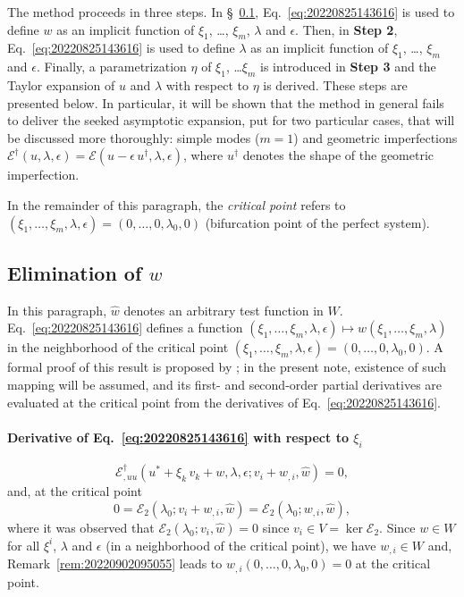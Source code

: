 \documentclass[12pt, final]{scrartcl}
\theoremstyle{definition}
\newcommand{\E}{\mathcal E}
\newcommand{\EE}{\mathcal E ^ \dagger}
\newcommand{\uu}{u^\dagger}
\begin{document}
The method proceeds in three steps. In \S~\ref{sec:20221020140204}, Eq.~\eqref{eq:20220825143616} is used to define $w$
as an implicit function of $\xi_1$, \dots, $\xi_m$, $\lambda$ and \(\epsilon\). Then, in \textbf{Step 2},
Eq.~\eqref{eq:20220825143616} is used to define $\lambda$ as an implicit function of $\xi_1$, \dots, $\xi_m$ and
\(\epsilon\). Finally, a parametrization $\eta$ of $\xi_1$, \dots $\xi_m$ is introduced in \textbf{Step 3} and the
Taylor expansion of $u$ and $\lambda$ with respect to $\eta$ is derived. These steps are presented below. In particular,
it will be shown that the method in general fails to deliver the seeked asymptotic expansion, put for two particular
cases, that will be discussed more thoroughly: simple modes (\(m = 1\)) and geometric imperfections
\(\EE(u, \lambda, \epsilon) = \E(u - \epsilon \, \uu, \lambda, \epsilon)\), where \(\uu\) denotes the shape of the
geometric imperfection.

In the remainder of this paragraph, the \emph{critical point} refers to
\((\xi_1, \ldots, \xi_m, \lambda, \epsilon) = (0, \ldots, 0, \lambda_0, 0)\) (bifurcation point of the perfect system).

\subsection{Elimination of \(w\)}
\label{sec:20221020140204}

In this paragraph, $\hat{w}$ denotes an arbitrary test function in $W$. Eq.~\eqref{eq:20220825143616} defines a function
$(\xi_1, \ldots, \xi_m, \lambda, \epsilon) \mapsto w(\xi_1, \ldots, \xi_m, \lambda)$ in the neighborhood of the critical point
$(\xi_1, \ldots, \xi_m, \lambda, \epsilon) = (0, \ldots, 0, \lambda_0, 0)$. A formal proof of this result is proposed by \textcite{poti1987}; in the
present note, existence of such mapping will be assumed, and its first- and second-order partial derivatives are
evaluated at the critical point from the derivatives of Eq.~\eqref{eq:20220825143616}.

\paragraph{Derivative of Eq.~\eqref{eq:20220825143616} with respect to \(\xi_i\)}
\begin{equation}
  \label{eq:20220826140926}
  \EE_{,uu}(u^\ast + \xi_k \, v_k + w, \lambda, \epsilon; v_i + w_{,i}, \hat{w}) = 0,
\end{equation}
and, at the critical point
\begin{equation}
  \label{eq:20220825150219}
  0 = \E_2(\lambda_0; v_i + w_{,i}, \hat{w}) = \E_2(\lambda_0; w_{,i}, \hat{w}),
\end{equation}
where it was observed that \(\E_2(\lambda_0; v_i, \hat{w}) = 0\) since \(v_i \in V = \ker \E_2\). Since $w \in W$ for all
$\xi^i$, $\lambda$ and \(\epsilon\) (in a neighborhood of the critical point), we have $w_{,i} \in W$ and,
Remark~\ref{rem:20220902095055} leads to $w_{,i}(0, \ldots, 0, \lambda_0, 0) = 0$ at the critical point.
\end{document}
